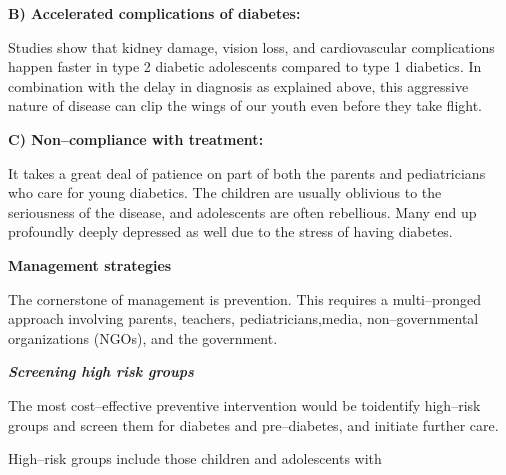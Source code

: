 \noindent\textbf{B) Accelerated complications of diabetes:}

Studies show that kidney damage, vision loss, and cardiovascular complications happen faster in type 2 diabetic adolescents compared to type 1 diabetics. In combination with the delay in diagnosis as explained above, this aggressive nature of disease can clip the wings of our youth even before they take flight.

\noindent\textbf{C) Non–compliance with treatment:}

It takes a great deal of patience on part of both the parents and pediatricians who care for young diabetics. The children are usually oblivious to the seriousness of the disease, and adolescents are often rebellious. Many end up profoundly deeply depressed as well due to the stress of having diabetes.


\noindent\textbf{Management strategies}

The cornerstone of management is prevention. This requires a multi–pronged approach involving parents, teachers, pediatricians,\break media, non–governmental organizations (NGOs), and the government.

\noindent\textbf{\textit{Screening high risk groups}}

The most cost–effective preventive intervention would be to\break identify high–risk groups and screen them for diabetes and pre–dia\-betes, and initiate further care.

\noindent High–risk groups include those children and adolescents with

